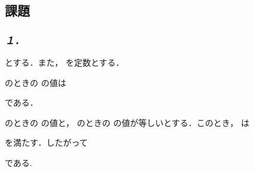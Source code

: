\documentclass{article}
\begin{document}
\subsection{\textbf{課題}}
\subsubsection{\textbf{\textit{１．}}}
\begin{maplegroup}
\begin{Maple Normal}{
とする．また，
を定数とする．}\end{Maple Normal}

\begin{Maple Normal}{
のときの
の値は}\end{Maple Normal}

\begin{center}
\begin{Maple Normal}{
}\end{Maple Normal}
\end{center}
\begin{Maple Normal}{
である．}\end{Maple Normal}

\begin{Maple Normal}{
のときの
の値と，
のときの
の値が等しいとする．このとき，
は}\end{Maple Normal}

\begin{center}
\begin{Maple Normal}{
}\end{Maple Normal}
\end{center}
\begin{Maple Normal}{
を満たす．したがって}\end{Maple Normal}

\begin{center}
\begin{Maple Normal}{
}\end{Maple Normal}
\end{center}
\begin{Maple Normal}{
である.}\end{Maple Normal}
\end{maplegroup}
\end{document}
